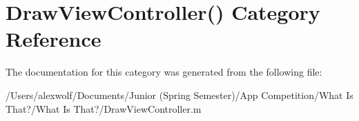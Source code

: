 \hypertarget{category_draw_view_controller_07_08}{\section{Draw\-View\-Controller() Category Reference}
\label{category_draw_view_controller_07_08}
}


The documentation for this category was generated from the following file\-:\begin{DoxyCompactItemize}
\item 
/\-Users/alexwolf/\-Documents/\-Junior (\-Spring Semester)/\-App Competition/\-What Is That?/\-What Is That?/Draw\-View\-Controller.\-m\end{DoxyCompactItemize}
